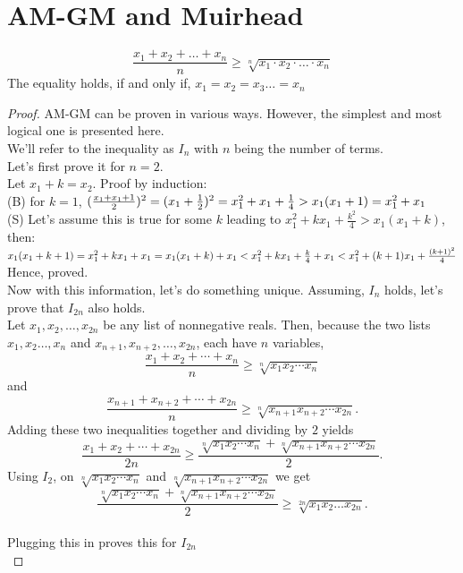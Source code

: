 \section{AM-GM and Muirhead}
\begin{theorem}
[AM-GM]
    \[\frac{x_1 + x_2 + \ldots + x_n}{n} \geq \sqrt[n]{x_1 \cdot x_2 \cdot \ldots \cdot x_n}\]
    The equality holds, if and only if, $x_1=x_2=x_3\dots=x_n$
\end{theorem}
\begin{proof}
    AM-GM can be proven in various ways. However, the simplest and most logical one is presented here.\\
    We'll refer to the inequality as $I_n$ with $n$ being the number of terms. \\
    Let's first prove it for $n=2$.\\
    Let $x_1+k=x_2$. Proof by induction:\\
    (B) for $k=1$, $(\frac{x_1+x_1+1}{2})^2\\
    =(x_1+\frac{1}{2})^2\\
    =x_1^2+x_1+\frac{1}{4}
    > x_1(x_1+1)=x_1^2+x_1$\\
    (S) Let's assume this is true for some $k$ leading to $x_1^2+kx_1+\frac{k^2}{4}>x_1(x_1+k)$, then:\\
    $x_1(x_1+k+1)\\
= x_1^2+kx_1+x_1\\
= x_1(x_1+k)+x_1\\
< x_1^2+kx_1+\frac{k}{4}+x_1\\
< x_1^2+(k+1)x_1+\frac{(k+1)^2}{4}$\\
Hence, proved.\\
Now with this information,  let's do something unique. Assuming, $I_n$ holds, let's prove that $I_{2n}$ also holds.\\
Let $x_1, x_2, \ldots, x_{2n}$ be any list of nonnegative reals. Then, because the two lists $x_1, x_2 \ldots, x_n$ and $x_{n+1}, x_{n+2}, \ldots, x_{2n}$, each have $n$ variables,
\[\frac{x_1 + x_2 + \cdots + x_n}{n} \geq \sqrt[n]{x_1 x_2 \cdots x_n}\] and\\
\[\frac{x_{n+1} + x_{n+2} + \cdots + x_{2n}}{n} \geq \sqrt[n]{x_{n+1} x_{n+2} \cdots x_{2n}}.\]
Adding these two inequalities together and dividing by $2$ yields\[\frac{x_1 + x_2 + \cdots + x_{2n}}{2n} \geq \frac{\sqrt[n]{x_1 x_2 \cdots x_n} + \sqrt[n]{x_{n+1} x_{n+2} \cdots x_{2n}}}{2}.\]
Using $I_2$, on $\sqrt[n]{x_1 x_2 \cdots x_n}$ and $\sqrt[n]{x_{n+1} x_{n+2} \cdots x_{2n}}$ we get
\[\frac{\sqrt[n]{x_1 x_2 \cdots x_n} + \sqrt[n]{x_{n+1} x_{n+2} \cdots x_{2n}}}{2} \geq \sqrt[2n]{x_1 x_2 \ldots x_{2n}}.\]\\Plugging this in proves this for $I_{2n}$\\

\end{proof}

